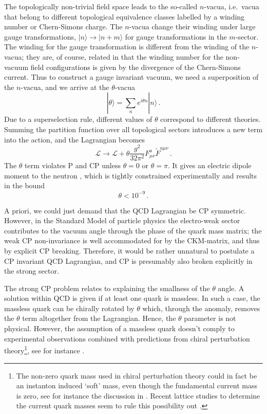 \documentclass[preprint,nofootinbib]{revtex4}
\newcommand{\ket}[1]{|#1\rangle}
\begin{document}
The topologically non-trivial field space leads to the so-called $n$-vacua, i.e.\ vacua that belong to different topological equivalence classes labelled by a winding number or Chern-Simons charge. The $n$-vacua change their winding under large gauge transformations, $\ket{n} \to \ket{n+m}$ for gauge transformations in the $m$-sector. The winding for the gauge transformation is different from the winding of the $n$-vacua; they are, of course, related in that the winding number for the non-vacuum field configurations is given by the divergence of the Chern-Simons current. Thus to construct a gauge invariant vacuum, we need a superposition of the $n$-vacua, and we arrive at the $\theta$-vacua
\begin{equation}
\ket{\theta}=\sum_n e^{i\theta n} \ket{n}\, .
\end{equation}
Due to a superselection rule, different values of $\theta$ correspond to different theories. Summing the partition function over all topological sectors introduces a new term into the action, and the Lagrangian becomes
\begin{equation}
\mathcal{L} \to \mathcal{L}+\theta\frac{g^2}{32\pi^2}F_{\mu\nu}^{a} \tilde{F}^{a\mu\nu}\, . \label{Leff}
\end{equation}
The $\theta$ term violates P and CP unless $\theta=0$ or $\theta=\pi$. It gives an electric dipole moment to the neutron \cite{baluni:cp:violation:qcd,crewther:divecchia:veneziano:witten:electric:dipole:moment}, which is tightly constrained experimentally \cite{baker:electric:dipole:neutron} and results in the bound
\begin{equation}
\theta < 10^{-9}\, .
\end{equation}

A priori, we could just demand that the QCD Lagrangian be CP symmetric. However, in the Standard Model of particle physics the electro-weak sector contributes to the vacuum angle through the phase of the quark mass matrix; the weak CP non-invariance is well accommodated for by the CKM-matrix, and thus by explicit CP breaking. Therefore, it would be rather unnatural to postulate a CP invariant QCD Lagrangian, and CP is presumably also broken explicitly in the strong sector.

The strong CP problem relates to explaining the smallness of the $\theta$ angle. A solution within QCD is given if at least one quark is massless. In such a case, the massless quark can be chirally rotated by $\theta$ which, through the anomaly, removes the $\theta$ term altogether from the Lagrangian. Hence, the $\theta$ parameter is not physical. However, the assumption of a massless quark doesn't comply to experimental observations combined with predictions from chiral perturbation theory\footnote{The non-zero quark mass used in chiral perturbation theory could in fact be an instanton induced `soft' mass, even though the fundamental current mass is zero, see for instance the discussion in \cite{kim:axion:quintessential,kim:axion:cdm}. Recent lattice studies to determine the current quark masses seem to rule this possibility out \cite{mason:trottier:horgan:davies:lepage:quark:masses}.}, see for instance \cite{weinberg:qft}.
\end{document}
